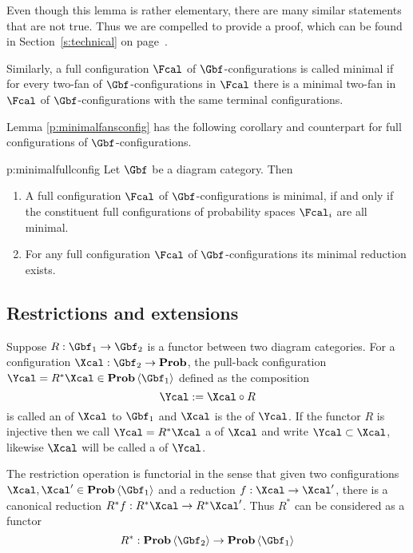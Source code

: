   Even though this lemma is rather elementary, there are many similar
  statements that are not true. Thus we are compelled to provide a
  proof, which can be found in Section~\ref{s:technical} on
  page~\pageref{p:minimalfansconfig.rep}.

  Similarly, a full configuration $\Fcal$ of $\Gbf$-configurations is
  called minimal if for every two-fan of $\Gbf$-configurations in
  $\Fcal$ there is a minimal two-fan in $\Fcal$ of
  $\Gbf$-configurations with the same terminal configurations.

  Lemma \ref{p:minimalfansconfig} has the following corollary and
  counterpart for full configurations of $\Gbf$-configurations.
  \begin{corollary}{p:minimalfullconfig}
    Let $\Gbf$ be a diagram category. Then
    \begin{enumerate}
    \item\label{p:minimalfullconfig1} 
      A full configuration $\Fcal$ of $\Gbf$-configurations is minimal,
      if and only if the constituent full configurations of probability
      spaces $\Fcal_{i}$ are all minimal.
    \item \label{p:minimalfullconfig2}   
      For any full configuration $\Fcal$ of $\Gbf$-configurations its
      minimal reduction exists.
    \end{enumerate}
  \end{corollary}
  
\subsection{Restrictions and extensions}
  \label{s:config-restrictions}
  Suppose $R:\Gbf_{1}\to \Gbf_{2}$ is a functor between two diagram
  categories. For a configuration $\Xcal:\Gbf_{2}\to \prob$, the pull-back
  configuration $\Ycal=R^{*}\Xcal\in\prob\<\Gbf_{1}>$ defined as the
  composition
  \[
    \Ycal
    :=
    \Xcal\circ R
  \]
  is called an  of $\Xcal$
  to $\Gbf_1$ and $\Xcal$ is the  of $\Ycal$. If the functor $R$ is
  injective then we call $\Ycal=R^{*}\Xcal$ a 
  of $\Xcal$ and write $\Ycal\subset\Xcal$, likewise $\Xcal$ will be
  called a  of $\Ycal$.

  The restriction operation is functorial in the sense that given
  two configurations 
  $\Xcal,\Xcal'\in\prob\<\Gbf_{1}>$ and a reduction
  $f:\Xcal\to\Xcal'$, there is a canonical reduction
  $R^{*}f:R^{*}\Xcal\to R^{*}\Xcal'$. Thus $R^{*}$ can be considered
  as a functor
  \[
    R^{*}:\prob\<\Gbf_{2}>\to\prob\<\Gbf_{1}>
  \]
  
